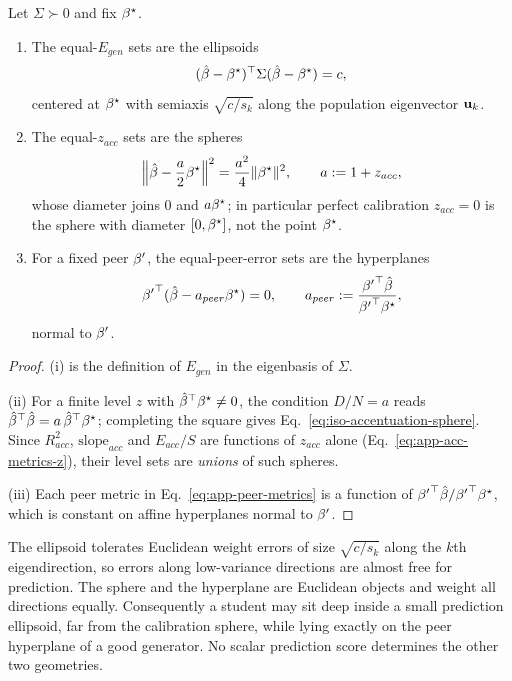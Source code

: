 \begin{prop}
Let $\Sigma\succ0$ and fix ${\beta^{\star}}$.
\begin{enumerate}
\item The equal-$E_{gen}$ sets are the ellipsoids
\begin{equation}
(\hat{\beta}-{\beta^{\star}})^\top\Sigma(\hat{\beta}-{\beta^{\star}})=c ,
\label{eq:iso-generalization-ellipsoid}
\end{equation}
centered at ${\beta^{\star}}$ with semiaxis $\sqrt{c/s_k}$ along the population
eigenvector ${\mathbf{u}}_k$.
\item The equal-$z_{acc}$ sets are the spheres
\begin{equation}
\Big\|\hat{\beta}-\frac{a}{2}{\beta^{\star}}\Big\|^2=\frac{a^2}{4}\|{\beta^{\star}}\|^2,
\qquad a:=1+z_{acc},
\label{eq:iso-accentuation-sphere}
\end{equation}
whose diameter joins $0$ and $a{\beta^{\star}}$; in particular perfect calibration
$z_{acc}=0$ is the sphere with diameter $[0,{\beta^{\star}}]$, not the point ${\beta^{\star}}$.
\item For a fixed peer ${\beta^{\prime}}$, the equal-peer-error sets are the
hyperplanes
\begin{equation}
{{\beta^{\prime}}}^\top(\hat{\beta}-a_{peer}{\beta^{\star}})=0,\qquad
a_{peer}:=\frac{{{\beta^{\prime}}}^\top\hat{\beta}}{{{\beta^{\prime}}}^\top{\beta^{\star}}},
\label{eq:iso-peer-hyperplane}
\end{equation}
normal to ${\beta^{\prime}}$.
\end{enumerate}
\end{prop}
\begin{proof}
(i) is the definition of $E_{gen}$ in the eigenbasis of $\Sigma$.

(ii) For a finite level $z$ with ${\hat{\beta}}^\top{\beta^{\star}}\ne0$, the condition
$D/N=a$ reads ${\hat{\beta}}^\top\hat{\beta}=a\,{\hat{\beta}}^\top{\beta^{\star}}$; completing the
square gives Eq.~\ref{eq:iso-accentuation-sphere}.  Since $R^2_{acc}$,
$\mathrm{slope}_{acc}$ and $E_{acc}/S$ are functions of $z_{acc}$ alone
(Eq.~\ref{eq:app-acc-metrics-z}), their level sets are \textit{unions} of such
spheres.  

(iii) Each peer metric in Eq.~\ref{eq:app-peer-metrics} is a
function of ${{\beta^{\prime}}}^\top\hat{\beta}/{{\beta^{\prime}}}^\top{\beta^{\star}}$, which is constant
on affine hyperplanes normal to ${\beta^{\prime}}$.
\end{proof}

\begin{remark}
The ellipsoid tolerates Euclidean weight errors of size $\sqrt{c/s_k}$ along
the $k$th eigendirection, so errors along low-variance directions are almost
free for prediction.  The sphere and the hyperplane are Euclidean objects and
weight all directions equally.  Consequently a student may sit deep inside a
small prediction ellipsoid, far from the calibration sphere, while lying
exactly on the peer hyperplane of a good generator.  No scalar prediction
score determines the other two geometries.
\end{remark}

